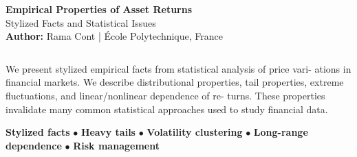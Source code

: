 \documentclass[final]{beamer}
\begin{document}
\begin{frame}[t]

\begin{tcolorbox}[colback=white,colframe=headerred,boxrule=2pt,arc=0pt,
    left=10pt,right=10pt,top=5pt,bottom=5pt]
\begin{minipage}{0.12\linewidth}
\centering
\end{minipage}
\hfill
\begin{minipage}{1.0\linewidth}
\centering
{\fontsize{65}{78}\selectfont\textbf{Empirical Properties of Asset Returns}}\\[0.3cm]
{\fontsize{48}{58}\selectfont Stylized Facts and Statistical Issues}\\[0.2cm]
{\Large\textbf{Author:} Rama Cont | École Polytechnique, France}
\end{minipage}
\end{tcolorbox}

\vspace{0.6cm}

\begin{columns}[t]

\begin{column}{.48\linewidth}

\begin{tcolorbox}[mybox, title=Abstract]
\large

We present stylized empirical facts from statistical analysis of price vari-
ations in financial markets. We describe distributional properties, tail
properties, extreme fluctuations, and linear/nonlinear dependence of re-
turns. These properties invalidate many common statistical approaches
used to study financial data.

\end{tcolorbox}

\vspace{0.5cm}

\begin{tcolorbox}[mybox, title=Keywords]
\large
\textbf{Stylized facts} $\bullet$ \textbf{Heavy tails} $\bullet$ \textbf{Volatility clustering} $\bullet$ \textbf{Long-range dependence} $\bullet$ \textbf{Risk management}
\end{tcolorbox}

\vspace{0.5cm}


\end{column}
\end{columns}
\end{frame}
\end{document}
